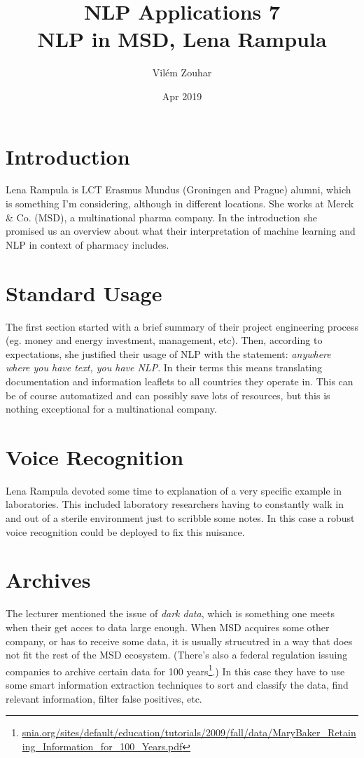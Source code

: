 \documentclass[a4paper]{article}
\begin{document}
\title{NLP Applications 7\\NLP in MSD, Lena Rampula}
\author{Vilém Zouhar}
\date{Apr 2019}
\maketitle 

\section*{Introduction}

Lena Rampula is LCT Erasmus Mundus (Groningen and Prague) alumni, which is something I'm considering, although in different locations. She works at Merck \& Co. (MSD), a multinational pharma company. In the introduction she promised us an overview about what their interpretation of machine learning and NLP in context of pharmacy includes.

\section*{Standard Usage}

The first section started with a brief summary of their project engineering process (eg. money and energy investment, management, etc). Then, according to expectations, she justified their usage of NLP with the statement: \textit{anywhere where you have text, you have NLP}. In their terms this means translating documentation and information leaflets to all countries they operate in. This can be of course automatized and can possibly save lots of resources, but this is nothing exceptional for a multinational company. 

\section*{Voice Recognition}

Lena Rampula devoted some time to explanation of a very specific example in laboratories. This included laboratory researchers having to constantly walk in and out of a sterile environment just to scribble some notes. In this case a robust voice recognition could be deployed to fix this nuisance.

\section*{Archives}

The lecturer mentioned the issue of \textit{dark data}, which is something one meets when their get acces to data large enough. When MSD acquires some other company, or has to receive some data, it is usually strucutred in a way that does not fit the rest of the MSD ecosystem. (There's also a federal regulation issuing companies to archive certain data for 100 years\footnote{\href{https://www.snia.org/sites/default/education/tutorials/2009/fall/data/MaryBaker\_Retaining\_Information\_for\_100\_Years.pdf}{snia.org/sites/default/education/tutorials/2009/fall/data/MaryBaker\_Retaining\_Information\_for\_100\_Years.pdf}}.) In this case they have to use some smart information extraction techniques to sort and classify the data, find relevant information, filter false positives, etc.
\end{document}
